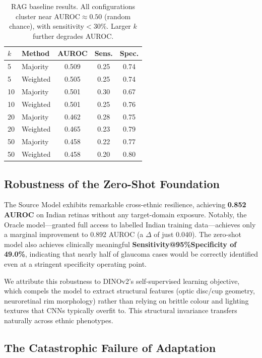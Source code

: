 \documentclass[11pt,twocolumn]{article}
\begin{document}
\begin{table}[h]
\centering
\small
\begin{tabular}{llccc}
\toprule
$k$ & \textbf{Method} & \textbf{AUROC} & \textbf{Sens.} & \textbf{Spec.} \\
\midrule
5  & Majority & 0.509 & 0.25 & 0.74 \\
5  & Weighted & 0.505 & 0.25 & 0.74 \\
10 & Majority & 0.501 & 0.30 & 0.67 \\
10 & Weighted & 0.501 & 0.25 & 0.76 \\
20 & Majority & 0.462 & 0.28 & 0.75 \\
20 & Weighted & 0.465 & 0.23 & 0.79 \\
50 & Majority & 0.458 & 0.22 & 0.77 \\
50 & Weighted & 0.458 & 0.20 & 0.80 \\
\bottomrule
\end{tabular}
\caption{RAG baseline results. All configurations cluster near AUROC${\approx}0.50$ (random chance), with sensitivity$<30\%$. Larger $k$ further degrades AUROC.}
\label{tab:rag}
\end{table}

\subsection{Robustness of the Zero-Shot Foundation}
\label{sec:zero_shot}

The Source Model exhibits remarkable cross-ethnic resilience, achieving \textbf{0.852 AUROC} on Indian retinas without any target-domain exposure. Notably, the Oracle model---granted full access to labelled Indian training data---achieves only a marginal improvement to 0.892 AUROC (a $\Delta$ of just 0.040). The zero-shot model also achieves clinically meaningful \textbf{Sensitivity@95\%Specificity of 49.0\%}, indicating that nearly half of glaucoma cases would be correctly identified even at a stringent specificity operating point.

We attribute this robustness to DINOv2's self-supervised learning objective, which compels the model to extract structural features (optic disc/cup geometry, neuroretinal rim morphology) rather than relying on brittle colour and lighting textures that CNNs typically overfit to. This structural invariance transfers naturally across ethnic phenotypes.

\subsection{The Catastrophic Failure of Adaptation}
\label{sec:collapse}
\end{document}
